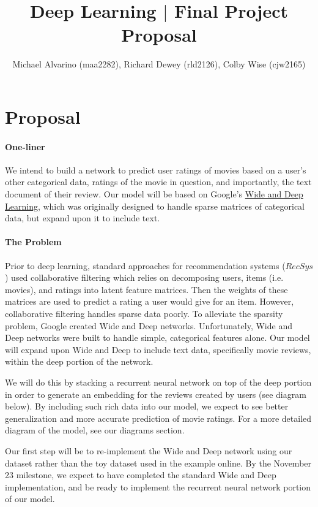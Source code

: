 \documentclass[preprint,10.5pt]{article}
\begin{document}
\title{Deep Learning $|$ Final Project Proposal}
\author{Michael Alvarino (maa2282), Richard Dewey (rld2126), Colby Wise (cjw2165)}

\maketitle

\section{Proposal}
\paragraph{One-liner} We intend to build a network to predict user ratings of movies based on a user's other categorical data, ratings of the movie in question, and importantly, the text document of their review. Our model will be based on Google's \href{https://arxiv.org/pdf/1606.07792.pdf}{Wide and Deep Learning}, which was originally designed to handle sparse matrices of categorical data, but expand upon it to include text.

\paragraph{The Problem} Prior to deep learning, standard approaches for recommendation systems ($RecSys$) used collaborative filtering which relies on decomposing users, items (i.e. movies), and ratings into latent feature matrices. Then the weights of these matrices are used to predict a rating a user would give for an item. However, collaborative filtering handles sparse data poorly. To alleviate the sparsity problem, Google created Wide and Deep networks. Unfortunately, Wide and Deep networks were built to handle simple, categorical features alone. Our model will expand upon Wide and Deep to include text data, specifically movie reviews, within the deep portion of the network.
\par We will do this by stacking a recurrent neural network on top of the deep portion in order to generate an embedding for the reviews created by users (see diagram below). By including such rich data into our model, we expect to see better generalization and more accurate prediction of movie ratings. For a more detailed diagram of the model, see our diagrams section.
\par Our first step will be to re-implement the Wide and Deep network using our dataset rather than the toy dataset used in the example online. By the November 23 milestone, we expect to have completed the standard Wide and Deep implementation, and be ready to implement the recurrent neural network portion of our model.
\end{document}
